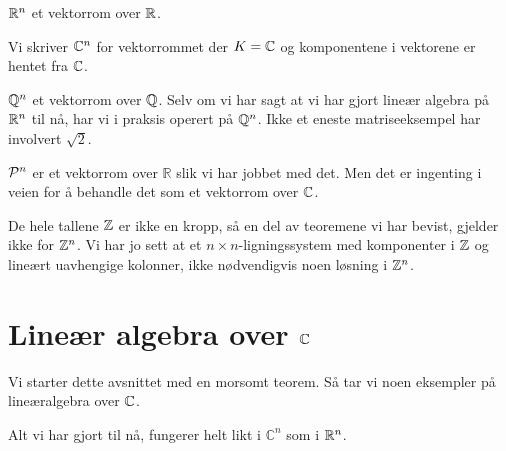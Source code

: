 \begin{ex}
$\R^n$ et vektorrom over $\R$.
\end{ex}

\begin{ex}
Vi skriver $\C^n$ for vektorrommet der $K=\C$ og komponentene i vektorene er hentet fra $\C$.
\end{ex}

\begin{ex}
$\Q^n$ et vektorrom over $\Q$. Selv om vi har sagt at vi har gjort lineær algebra på $\R^n$ til nå, har vi i praksis operert på $\Q^n$. Ikke et eneste matriseeksempel har involvert $\sqrt{2}$.
\end{ex}

\begin{ex}
$\P^n$ er et vektorrom over $\mathbb R$ slik vi har jobbet med det. 
Men det er ingenting i veien for å behandle det som et vektorrom over $\C$.
\end{ex}


\begin{ex}
De hele tallene $\Z$ er ikke en kropp, så en del av teoremene vi har bevist, gjelder ikke for $\Z^n$. 
Vi har jo sett at et $n\times n$-ligningssystem med komponenter i $\Z$ og lineært uavhengige kolonner,  
ikke nødvendigvis noen løsning i $\Z^n$. 
\end{ex}



\section*{Lineær algebra over $\C$}

Vi starter dette avsnittet med en morsomt teorem. Så tar vi noen eksempler på lineæralgebra over $\C$.

\begin{thm}
Alt vi har gjort til nå, fungerer helt likt i $\mathbb C^n$ som i $\R^n$. 
\end{thm}




